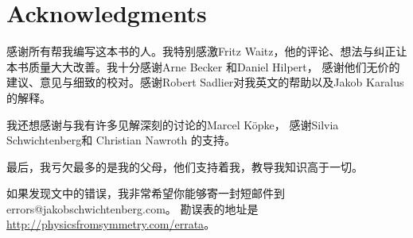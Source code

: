 
\chapter{Acknowledgments}
感谢所有帮我编写这本书的人。我特别感激Fritz Waitz，他的评论、想法与纠正让本书质量大大改善。我十分感谢Arne Becker 和Daniel Hilpert， 感谢他们无价的建议、意见与细致的校对。感谢Robert Sadlier对我英文的帮助以及Jakob Karalus的解释。

我还想感谢与我有许多见解深刻的讨论的Marcel K\"opke， 感谢Silvia Schwichtenberg和 Christian Nawroth 的支持。

最后，我亏欠最多的是我的父母，他们支持着我，教导我知识高于一切。

如果发现文中的错误，我非常希望你能够寄一封短邮件到 errors@jakobschwichtenberg.com。 勘误表的地址是\url{http://physicsfromsymmetry.com/errata}。
